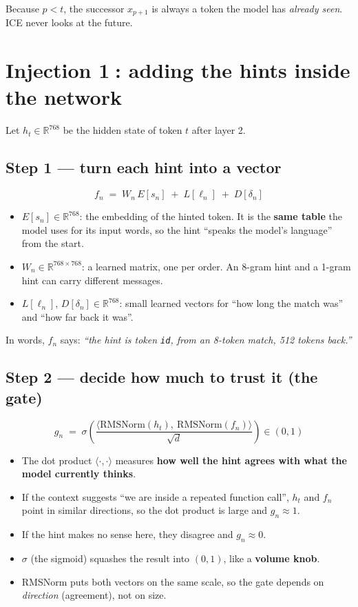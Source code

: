 \documentclass[11pt]{article}
\newcommand{\R}{\mathbb{R}}
\newcommand{\norm}{\mathrm{RMSNorm}}
\begin{document}
Because $p < t$, the successor $x_{p+1}$ is always a token the model has \emph{already seen}. ICE never looks at the future.

\section{Injection \textcircled{1}: adding the hints inside the network}

Let $h_t \in \R^{768}$ be the hidden state of token $t$ after layer 2.

\subsection*{Step 1 --- turn each hint into a vector}
\[
\boxed{\, f_n \;=\; W_n \, E[s_n] \;+\; L[\ell_n] \;+\; D[\delta_n] \,}
\]
\begin{itemize}
  \item $E[s_n] \in \R^{768}$: the embedding of the hinted token. It is the \textbf{same table} the model uses for its input words, so the hint ``speaks the model's language'' from the start.
  \item $W_n \in \R^{768 \times 768}$: a learned matrix, one per order. An 8-gram hint and a 1-gram hint can carry different messages.
  \item $L[\ell_n]$, $D[\delta_n] \in \R^{768}$: small learned vectors for ``how long the match was'' and ``how far back it was''.
\end{itemize}
In words, $f_n$ says: \emph{``the hint is token \texttt{id}, from an 8-token match, 512 tokens back.''}

\subsection*{Step 2 --- decide how much to trust it (the gate)}
\[
\boxed{\, g_n \;=\; \sigma\!\left( \frac{\big\langle \norm(h_t),\ \norm(f_n) \big\rangle}{\sqrt{d}} \right) \in (0,1) \,}
\]
\begin{itemize}
  \item The dot product $\langle\cdot,\cdot\rangle$ measures \textbf{how well the hint agrees with what the model currently thinks}.
  \item If the context suggests ``we are inside a repeated function call'', $h_t$ and $f_n$ point in similar directions, so the dot product is large and $g_n \approx 1$.
  \item If the hint makes no sense here, they disagree and $g_n \approx 0$.
  \item $\sigma$ (the sigmoid) squashes the result into $(0,1)$, like a \textbf{volume knob}.
  \item RMSNorm puts both vectors on the same scale, so the gate depends on \emph{direction} (agreement), not on size.
\end{itemize}
\end{document}

